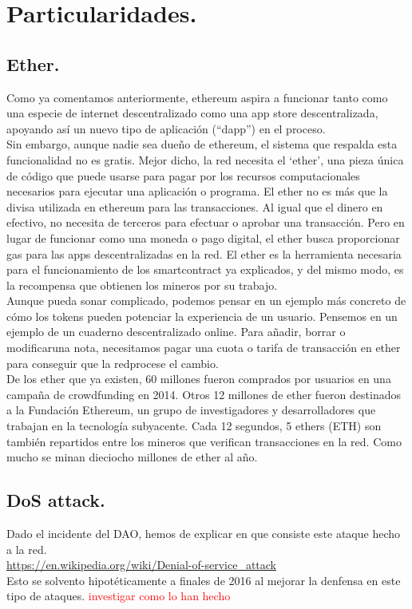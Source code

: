 \documentclass[11pt,a4paper]{article}
\begin{document}
\section{Particularidades.}

\subsection{Ether.}
\label{sec:ether}

Como ya comentamos anteriormente, ethereum aspira a funcionar tanto como una especie de
internet descentralizado como una app store descentralizada, apoyando así un nuevo tipo de aplicación (“dapp”) en el proceso.\\

Sin embargo, aunque nadie sea dueño de ethereum, el sistema que respalda esta funcionalidad no es gratis. Mejor dicho, la red necesita el ‘ether’, una pieza única de código que puede usarse para pagar por los recursos computacionales necesarios para ejecutar una aplicación o programa. El ether no es más que la divisa utilizada en ethereum para las transacciones. Al igual que el dinero en efectivo, no necesita de terceros para efectuar o aprobar una transacción. Pero en lugar de funcionar como una moneda o pago digital, el ether busca proporcionar gas para las apps descentralizadas en la red. El ether es la herramienta necesaria para el funcionamiento de los smartcontract ya explicados,  y del mismo modo, es la recompensa que obtienen los mineros por su trabajo.\\

Aunque pueda sonar complicado, podemos pensar en un ejemplo más concreto de cómo los tokens pueden potenciar la experiencia de un usuario. Pensemos en un ejemplo de un cuaderno descentralizado online. Para añadir, borrar o modificaruna nota, necesitamos pagar una cuota o tarifa de transacción en ether para conseguir que la redprocese el cambio.\\

De los ether que ya existen, 60 millones fueron comprados por usuarios en una campaña de
crowdfunding en 2014. Otros 12 millones de ether fueron destinados a la Fundación Ethereum, un grupo de investigadores y desarrolladores que trabajan en la tecnología subyacente. Cada 12 segundos, 5 ethers (ETH) son también repartidos entre los mineros que verifican transacciones en la red. Como mucho se minan dieciocho millones de ether al año.\\


\subsection{DoS attack.}
Dado el incidente del DAO, hemos de explicar en que consiste este ataque hecho a la red.		 \\
\url{https://en.wikipedia.org/wiki/Denial-of-service_attack}\\
Esto se solvento hipotéticamente a finales de 2016 al mejorar la denfensa en este tipo de ataques. \textcolor{red}{investigar como lo han hecho}
\end{document}
